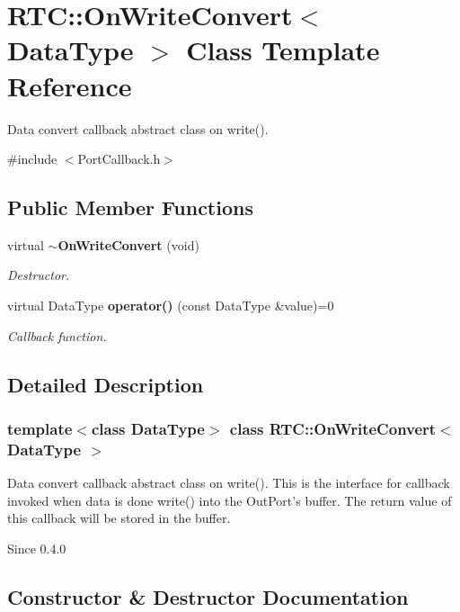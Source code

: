 \section{RTC::OnWriteConvert$<$ DataType $>$ Class Template Reference}
\label{structRTC_1_1OnWriteConvert}


Data convert callback abstract class on write().  




{\ttfamily \#include $<$PortCallback.h$>$}

\subsection*{Public Member Functions}
\begin{DoxyCompactItemize}
\item 
virtual {\bf $\sim$OnWriteConvert} (void)
\begin{DoxyCompactList}\small\item\em Destructor. \item\end{DoxyCompactList}\item 
virtual DataType {\bf operator()} (const DataType \&value)=0
\begin{DoxyCompactList}\small\item\em Callback function. \item\end{DoxyCompactList}\end{DoxyCompactItemize}


\subsection{Detailed Description}
\subsubsection*{template$<$class DataType$>$ class RTC::OnWriteConvert$<$ DataType $>$}

Data convert callback abstract class on write(). This is the interface for callback invoked when data is done write() into the OutPort's buffer. The return value of this callback will be stored in the buffer.

\begin{DoxySince}{Since}
0.4.0 
\end{DoxySince}


\subsection{Constructor \& Destructor Documentation}
